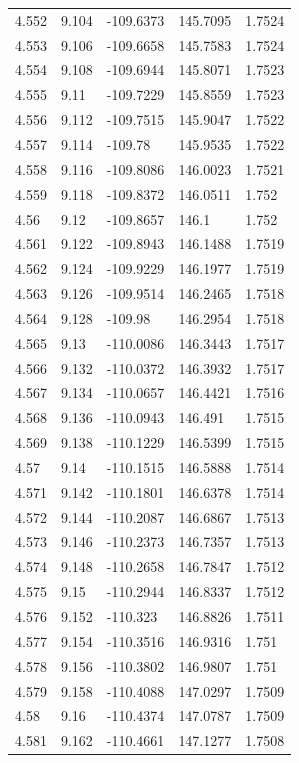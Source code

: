 \begin{tabular}{lllll}
4.552 & 9.104 & -109.6373 & 145.7095 & 1.7524 \\
4.553 & 9.106 & -109.6658 & 145.7583 & 1.7524 \\
4.554 & 9.108 & -109.6944 & 145.8071 & 1.7523 \\
4.555 & 9.11 & -109.7229 & 145.8559 & 1.7523 \\
4.556 & 9.112 & -109.7515 & 145.9047 & 1.7522 \\
4.557 & 9.114 & -109.78 & 145.9535 & 1.7522 \\
4.558 & 9.116 & -109.8086 & 146.0023 & 1.7521 \\
4.559 & 9.118 & -109.8372 & 146.0511 & 1.752 \\
4.56 & 9.12 & -109.8657 & 146.1 & 1.752 \\
4.561 & 9.122 & -109.8943 & 146.1488 & 1.7519 \\
4.562 & 9.124 & -109.9229 & 146.1977 & 1.7519 \\
4.563 & 9.126 & -109.9514 & 146.2465 & 1.7518 \\
4.564 & 9.128 & -109.98 & 146.2954 & 1.7518 \\
4.565 & 9.13 & -110.0086 & 146.3443 & 1.7517 \\
4.566 & 9.132 & -110.0372 & 146.3932 & 1.7517 \\
4.567 & 9.134 & -110.0657 & 146.4421 & 1.7516 \\
4.568 & 9.136 & -110.0943 & 146.491 & 1.7515 \\
4.569 & 9.138 & -110.1229 & 146.5399 & 1.7515 \\
4.57 & 9.14 & -110.1515 & 146.5888 & 1.7514 \\
4.571 & 9.142 & -110.1801 & 146.6378 & 1.7514 \\
4.572 & 9.144 & -110.2087 & 146.6867 & 1.7513 \\
4.573 & 9.146 & -110.2373 & 146.7357 & 1.7513 \\
4.574 & 9.148 & -110.2658 & 146.7847 & 1.7512 \\
4.575 & 9.15 & -110.2944 & 146.8337 & 1.7512 \\
4.576 & 9.152 & -110.323 & 146.8826 & 1.7511 \\
4.577 & 9.154 & -110.3516 & 146.9316 & 1.751 \\
4.578 & 9.156 & -110.3802 & 146.9807 & 1.751 \\
4.579 & 9.158 & -110.4088 & 147.0297 & 1.7509 \\
4.58 & 9.16 & -110.4374 & 147.0787 & 1.7509 \\
4.581 & 9.162 & -110.4661 & 147.1277 & 1.7508 \\

\end{tabular}
